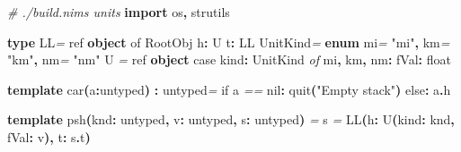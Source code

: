 \documentclass[
  12pt,
]{book}
\newenvironment{Shaded}{}{}
\newcommand{\CommentTok}[1]{\textcolor[rgb]{0.38,0.63,0.69}{\textit{#1}}}
\newcommand{\DataTypeTok}[1]{\textcolor[rgb]{0.56,0.13,0.00}{#1}}
\newcommand{\FloatTok}[1]{\textcolor[rgb]{0.25,0.63,0.44}{#1}}
\newcommand{\KeywordTok}[1]{\textcolor[rgb]{0.00,0.44,0.13}{\textbf{#1}}}
\newcommand{\NormalTok}[1]{#1}
\newcommand{\StringTok}[1]{\textcolor[rgb]{0.25,0.44,0.63}{#1}}
\begin{document}
\begin{Shaded}
\begin{Highlighting}[]
\CommentTok{\# ./build.nims units}
\KeywordTok{import}\NormalTok{ os}\KeywordTok{,}\NormalTok{ strutils}

\KeywordTok{type}
  \DataTypeTok{LL}\CommentTok{=} \DataTypeTok{ref} \KeywordTok{object }\DataTypeTok{of}\CommentTok{ }\DataTypeTok{RootObj}
\NormalTok{          h}\KeywordTok{:}  \DataTypeTok{U}
\NormalTok{          t}\KeywordTok{:} \DataTypeTok{LL}
  \DataTypeTok{UnitKind}\CommentTok{=} \KeywordTok{enum }\DataTypeTok{mi}\CommentTok{=} \StringTok{"mi"}\KeywordTok{,}\NormalTok{ km}\CommentTok{=} \StringTok{"km"}\KeywordTok{,}\NormalTok{ nm}\CommentTok{=} \StringTok{"nm"}
  \DataTypeTok{U} \CommentTok{=} \DataTypeTok{ref} \KeywordTok{object}
        \DataTypeTok{case}\NormalTok{ kind}\KeywordTok{:} \DataTypeTok{UnitKind}
           \CommentTok{of}\NormalTok{ mi}\KeywordTok{,}\NormalTok{ km}\KeywordTok{,}\NormalTok{ nm}\KeywordTok{:}\NormalTok{ fVal}\KeywordTok{:} \DataTypeTok{float}

\KeywordTok{template }\StringTok{car}\KeywordTok{(}\NormalTok{a}\KeywordTok{:}\DataTypeTok{untyped}\KeywordTok{)} \KeywordTok{:} \DataTypeTok{untyped}\CommentTok{=}
  \DataTypeTok{if}\NormalTok{ a }\CommentTok{==} \FloatTok{nil}\KeywordTok{:} \DataTypeTok{quit}\KeywordTok{(}\StringTok{"Empty stack"}\KeywordTok{)} \DataTypeTok{else}\KeywordTok{:}\NormalTok{ a}\KeywordTok{.}\DataTypeTok{h}

\KeywordTok{template }\StringTok{psh}\KeywordTok{(}\NormalTok{knd}\KeywordTok{:} \DataTypeTok{untyped}\KeywordTok{,}\NormalTok{ v}\KeywordTok{:} \DataTypeTok{untyped}\KeywordTok{,}\NormalTok{ s}\KeywordTok{:} \DataTypeTok{untyped}\KeywordTok{)} \CommentTok{=}
\NormalTok{  s }\CommentTok{=} \DataTypeTok{LL}\KeywordTok{(}\NormalTok{h}\KeywordTok{:} \DataTypeTok{U}\KeywordTok{(}\NormalTok{kind}\KeywordTok{:}\NormalTok{ knd}\KeywordTok{,}\NormalTok{ fVal}\KeywordTok{:}\NormalTok{ v}\KeywordTok{),}\NormalTok{ t}\KeywordTok{:}\NormalTok{ s}\KeywordTok{.}\DataTypeTok{t}\KeywordTok{)}


\end{Highlighting}
\end{Shaded}
\end{document}
